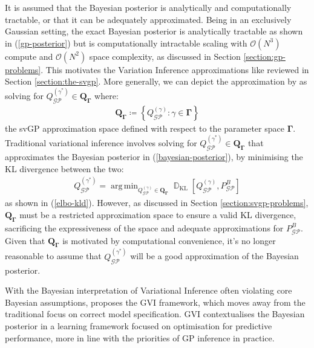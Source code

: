 \documentclass{article}
\newcommand{\D}{\operatorname{\mathbb{D}}}
\newcommand{\GP}{\operatorname{\mathcal{GP}}}
\DeclareMathOperator*{\argmin}{arg\,min}
\numberwithin{equation}{section}
\begin{document}
It is assumed that the Bayesian posterior is analytically and computationally tractable, or that it can be adequately approximated. Being in an exclusively Gaussian setting, the exact Bayesian posterior is analytically tractable as shown in (\ref{gp-posterior}) but is computationally intractable scaling with $\mathcal{O}(N^3)$ compute and $\mathcal{O}(N^2)$ space complexity, as discussed in Section \ref{section:gp-problems}. This motivates the Variation Inference approximations like \cite{titsias2009variational} reviewed in Section \ref{section:the-svgp}. More generally, we can depict the approximation by \cite{titsias2009variational} as solving for $Q_{\GP}^{(\gamma^*)} \in \boldsymbol{Q}_{\mathbf{\Gamma}}$ where:
\begin{align}
    \boldsymbol{Q}_{\boldsymbol{\Gamma}} \coloneqq \left\{Q_{\GP}^{(\gamma)}: \gamma \in \mathbf{\Gamma}\right\}
    \label{svgp-space}
\end{align}
the svGP approximation space defined with respect to the parameter space $\mathbf{\Gamma}$. Traditional variational inference involves solving for $Q_{\GP}^{(\gamma^*)} \in \boldsymbol{Q}_{\boldsymbol{\Gamma}}$ that approximates the Bayesian posterior in (\ref{bayesian-posterior}), by minimising the KL divergence between the two: 
\begin{align}
Q^{(\gamma^*)}_{\GP} = \argmin_{Q^{(\gamma)}_{\GP} \in \boldsymbol{Q}_{\boldsymbol{\Gamma}}}\D_{\text{KL}}\left[Q_{\GP}^{(\gamma)}, P_{\GP}^B\right]
\end{align}
as shown in (\ref{elbo-kld}).
However, as discussed in Section \ref{section:svgp-problems}, $\boldsymbol{Q}_{\boldsymbol{\Gamma}}$ must be a restricted approximation space to ensure a valid KL divergence, sacrificing the expressiveness of the space and adequate approximations for $P_{\GP}^B$. Given that $\boldsymbol{Q}_{\boldsymbol{\Gamma}}$ is motivated by computational convenience, it's no longer reasonable to assume that $Q_{\GP}^{(\gamma^*)}$ will be a good approximation of the Bayesian posterior.

With the Bayesian interpretation of Variational Inference often violating core Bayesian assumptions, \cite{knoblauch2022optimization} proposes the GVI framework, which moves away from the traditional focus on correct model specification. GVI contextualises the Bayesian posterior in a learning framework focused on optimisation for predictive performance, more in line with the priorities of GP inference in practice.
\end{document}
